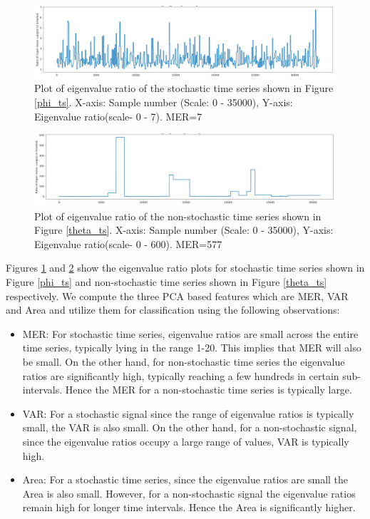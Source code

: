 \documentclass[10pt,conference]{IEEEtran}
\begin{document}
\begin{figure}[ht]
 \centering
 \includegraphics[width=0.9\linewidth]{phi_ts_eig.png}
 \caption{Plot of eigenvalue ratio of the stochastic time series shown in Figure \ref{phi_ts}. X-axis: Sample number (Scale: 0 - 35000), Y-axis: Eigenvalue ratio(scale- 0 - 7). MER=7}
 \label{phi_eig}
\end{figure}

\begin{figure}[ht]
 \centering
 \includegraphics[width=0.8\linewidth]{theta_ts_eig.png}
 \caption{Plot of eigenvalue ratio of the  non-stochastic time series shown in Figure \ref{theta_ts}. X-axis: Sample number (Scale: 0 - 35000), Y-axis: Eigenvalue ratio(scale- 0 - 600). MER=577 }
 \label{theta_eig}
\end{figure}

Figures \ref{phi_eig} and \ref{theta_eig} show the eigenvalue ratio plots for stochastic time series shown in Figure \ref{phi_ts} and  non-stochastic time series shown in Figure \ref{theta_ts} respectively. We compute the three PCA based features which are MER, VAR and Area  and utilize them for classification using the following observations:

\begin{itemize}
 \item MER: For stochastic time series, eigenvalue ratios  are small across the entire time series, typically lying in the range 1-20. This implies that MER  will also be small. On the other hand, for  non-stochastic time series the eigenvalue ratios are significantly high, typically reaching a few hundreds in certain sub-intervals. Hence the MER for a non-stochastic time series is typically large.
 \item VAR: For a stochastic signal since the range of eigenvalue ratios is typically small, the VAR is also small. On the other hand, for a non-stochastic signal, since the eigenvalue ratios occupy a large range of values, VAR is typically high.
 \item Area: For a stochastic time series, since the eigenvalue ratios  are small the Area is also small. However, for a non-stochastic signal the eigenvalue ratios remain high for longer time intervals. Hence the Area is significantly higher.
\end{itemize}
\end{document}
